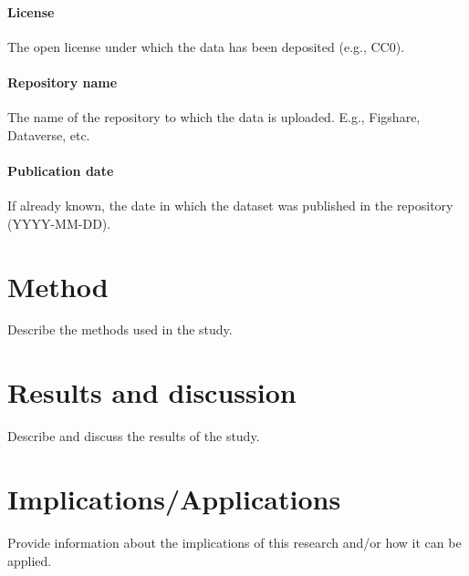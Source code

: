 \documentclass[11pt]{article}
\begin{document}
\paragraph{License} The open license under which the data has been deposited (e.g., CC0). 
\paragraph{Repository name} The name of the repository to which the data is uploaded. E.g., Figshare, Dataverse, etc. 
\paragraph{Publication date} If already known, the date in which the dataset was published in the repository (YYYY-MM-DD).

\section{Method}
Describe the methods used in the study.

\section{Results and discussion}
Describe and discuss the results of the study.

\section{Implications/Applications}
Provide information about the implications of this research and/or how it can be applied.

\newpage




\end{document}
